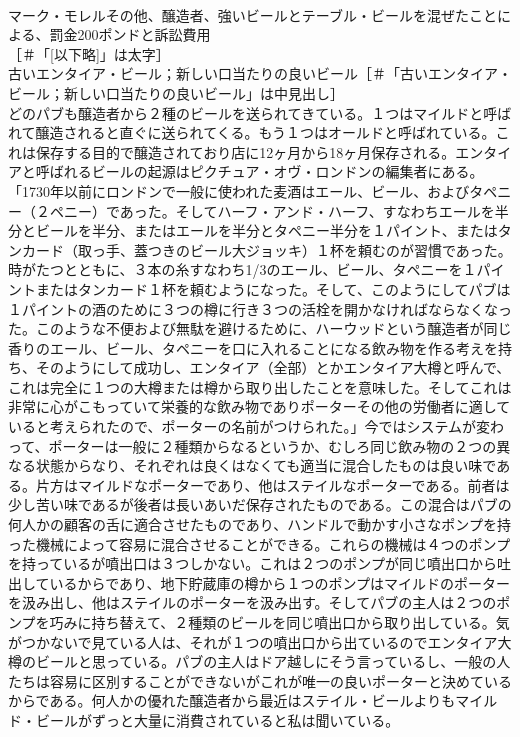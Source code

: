 \documentclass[8pt]{extreport}
\begin{document}
\begin{CJK}{UTF8}{min}
\\	マーク・モレルその他、醸造者、強いビールとテーブル・ビールを混ぜたことによる、罰金200ポンドと訴訟費用
\\	[以下略]［＃「[以下略]」は太字］
\\	古いエンタイア・ビール；新しい口当たりの良いビール［＃「古いエンタイア・ビール；新しい口当たりの良いビール」は中見出し］
\\	どのパブも醸造者から２種のビールを送られてきている。１つはマイルドと呼ばれて醸造されると直ぐに送られてくる。もう１つはオールドと呼ばれている。これは保存する目的で醸造されており店に12ヶ月から18ヶ月保存される。エンタイアと呼ばれるビールの起源はピクチュア・オヴ・ロンドンの編集者にある。「1730年以前にロンドンで一般に使われた麦酒はエール、ビール、およびタペニー（２ペニー）であった。そしてハーフ・アンド・ハーフ、すなわちエールを半分とビールを半分、またはエールを半分とタペニー半分を１パイント、またはタンカード（取っ手、蓋つきのビール大ジョッキ）１杯を頼むのが習慣であった。時がたつとともに、３本の糸すなわち1/3のエール、ビール、タペニーを１パイントまたはタンカード１杯を頼むようになった。そして、このようにしてパブは１パイントの酒のために３つの樽に行き３つの活栓を開かなければならなくなった。このような不便および無駄を避けるために、ハーウッドという醸造者が同じ香りのエール、ビール、タペニーを口に入れることになる飲み物を作る考えを持ち、そのようにして成功し、エンタイア（全部）とかエンタイア大樽と呼んで、これは完全に１つの大樽または樽から取り出したことを意味した。そしてこれは非常に心がこもっていて栄養的な飲み物でありポーターその他の労働者に適していると考えられたので、ポーターの名前がつけられた。」今ではシステムが変わって、ポーターは一般に２種類からなるというか、むしろ同じ飲み物の２つの異なる状態からなり、それぞれは良くはなくても適当に混合したものは良い味である。片方はマイルドなポーターであり、他はステイルなポーターである。前者は少し苦い味であるが後者は長いあいだ保存されたものである。この混合はパブの何人かの顧客の舌に適合させたものであり、ハンドルで動かす小さなポンプを持った機械によって容易に混合させることができる。これらの機械は４つのポンプを持っているが噴出口は３つしかない。これは２つのポンプが同じ噴出口から吐出しているからであり、地下貯蔵庫の樽から１つのポンプはマイルドのポーターを汲み出し、他はステイルのポーターを汲み出す。そしてパブの主人は２つのポンプを巧みに持ち替えて、２種類のビールを同じ噴出口から取り出している。気がつかないで見ている人は、それが１つの噴出口から出ているのでエンタイア大樽のビールと思っている。パブの主人はドア越しにそう言っているし、一般の人たちは容易に区別することができないがこれが唯一の良いポーターと決めているからである。何人かの優れた醸造者から最近はステイル・ビールよりもマイルド・ビールがずっと大量に消費されていると私は聞いている。

\end{CJK}
\end{document}
